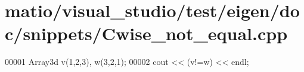 \hypertarget{matio_2visual__studio_2test_2eigen_2doc_2snippets_2_cwise__not__equal_8cpp_source}{}\section{matio/visual\+\_\+studio/test/eigen/doc/snippets/\+Cwise\+\_\+not\+\_\+equal.cpp}
\label{matio_2visual__studio_2test_2eigen_2doc_2snippets_2_cwise__not__equal_8cpp_source}

\begin{DoxyCode}
00001 Array3d v(1,2,3), w(3,2,1);
00002 cout << (v!=w) << endl;
\end{DoxyCode}
